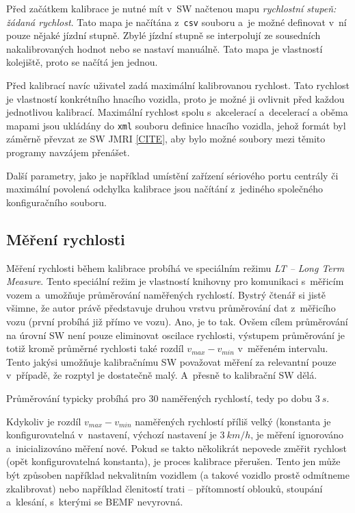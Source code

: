 Před začátkem kalibrace je nutné mít v~SW načtenou mapu \textit{rychlostní
stupeň: žádaná rychlost}. Tato mapa je načítána z~\texttt{csv} souboru a~je
možné definovat v~ní pouze nějaké jízdní stupně. Zbylé jízdní stupně se
interpolují ze sousedních nakalibrovaných hodnot nebo se nastaví manuálně.
Tato mapa je vlastností kolejiště, proto se načítá jen jednou.

Před kalibrací navíc uživatel zadá maximální kalibrovanou rychlost. Tato rychlost
je vlastností konkrétního hnacího vozidla, proto je možné ji ovlivnit před
každou jednotlivou kalibrací. Maximální rychlost spolu s~akcelerací a~decelerací
a oběma mapami jsou ukládány do \texttt{xml} souboru definice hnacího vozidla,
jehož formát byl záměrně převzat ze SW JMRI \ref{CITE}, aby bylo možné soubory
mezi těmito programy navzájem přenášet.

Další parametry, jako je například umístění zařízení sériového portu centrály
či maximální povolená odchylka kalibrace jsou načítání z~jediného společného
konfiguračního souboru.

\subsection{Měření rychlosti}
\label{sec:ac:lt-measure}

Měření rychlosti během kalibrace probíhá ve speciálním režimu \textit{LT --
Long Term Measure}. Tento speciální režim je vlastností knihovny pro komunikaci
s~měřicím vozem a~umožňuje průměrování naměřených rychlostí. Bystrý čtenář si
jistě všimne, že autor právě představuje druhou vrstvu průměrování dat
z~měřicího vozu (první probíhá již přímo ve vozu). Ano, je to tak. Ovšem cílem
průměrování na úrovní SW není pouze eliminovat oscilace rychlosti, výstupem
průměrování je totiž kromě průměrné rychlosti také rozdíl $v_{max} - v_{min}$
v~měřeném intervalu. Tento jakýsi  umožňuje kalibračnímu SW
považovat měření za relevantní pouze v~případě, že rozptyl je dostatečně malý.
A~přesně to kalibrační SW dělá.

Průměrování typicky probíhá pro $30$ naměřených rychlostí, tedy po dobu $3\ s$.

Kdykoliv je rozdíl $v_{max} - v_{min}$ naměřených rychlostí příliš velký
(konstanta je konfigurovatelná v~nastavení, výchozí nastavení je $3\ km/h$, je
měření ignorováno a~inicializováno měření nové. Pokud se takto několikrát
nepovede změřit rychlost (opět konfigurovatelná konstanta), je proces kalibrace
přerušen. Tento jen může být způsoben například nekvalitním vozidlem (a takové
vozidlo prostě odmítneme zkalibrovat) nebo například členitostí trati --
přítomností oblouků, stoupání a~klesání, s~kterými se BEMF nevyrovná.

